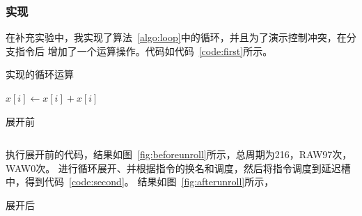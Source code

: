 \documentclass[a4paper,twoside]{article}
\begin{document}
\begin{spacing}{1.2}
\subsubsection{实现}

在补充实验中，我实现了算法~\ref{algo:loop}中的循环，并且为了演示控制冲突，在分支指令后
增加了一个运算操作。代码如代码~\ref{code:first}所示。

\begin{algorithm}
	\caption{实现的循环运算}
	\label{algo:loop}
	\begin{algorithmic}[1]
			\State $x[i] \gets x[i] + x[i]$
		\EndFor
	\end{algorithmic}
\end{algorithm}	

\begin{listing}[H]
	\caption{展开前}
	\label{code:first}
	\inputminted{nasm}{../code/before.s}
\end{listing}

执行展开前的代码，结果如图~\ref{fig:beforeunroll}所示，总周期为216，RAW97次，WAW0次。
进行循环展开、并根据指令的换名和调度，然后将指令调度到延迟槽中，得到代码~\ref{code:second}。
结果如图~\ref{fig:afterunroll}所示，

\begin{listing}[H]
	\caption{展开后}
	\label{code:second}
	\inputminted{nasm}{../code/after.s}
\end{listing}



\end{spacing}
\end{document}
